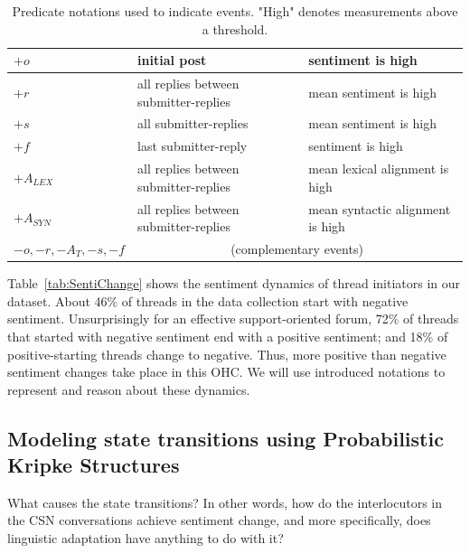 \documentclass[man,biblatex,floatsintext]{apa6}
\begin{document}
\begin{table}[tb]
\centering
\begin{tabular}{l|l|l}

$+o$         & initial post & sentiment is high     \\ \hline
$+r$         & all replies between submitter-replies & mean sentiment is high     \\ \hline
$+s$         & all submitter-replies  & mean sentiment is high     \\ \hline
$+f$         & last submitter-reply & sentiment is high     \\ \hline
$+A_{LEX}$         & all replies between submitter-replies & mean lexical alignment is high \\ \hline
$+A_{SYN}$         & all replies between submitter-replies & mean syntactic alignment is high \\ \hline
$-o,-r,-A_T,-s,-f$         & \multicolumn{2}{c}{(complementary events)}  \\
\end{tabular}
\caption{Predicate notations used to indicate events.  "High" denotes measurements above a threshold.}
\label{tab:notations}
\end{table}


Table~\ref{tab:SentiChange} shows the sentiment dynamics of thread initiators in our dataset. About 46\% of threads in the data collection start with negative sentiment. Unsurprisingly for an effective support-oriented forum, 72\% of threads that started with negative sentiment end with a positive sentiment; and 18\% of positive-starting threads change to negative. Thus,  more positive than negative sentiment changes take place in this OHC. We will use introduced notations to represent and reason about these dynamics.

\subsection{Modeling state transitions using Probabilistic Kripke Structures \label{sec:ProbKS}}

What causes the state transitions?  In other words, how do the interlocutors in the CSN conversations achieve sentiment change, and more specifically, does linguistic adaptation have anything to do with it?
\end{document}
